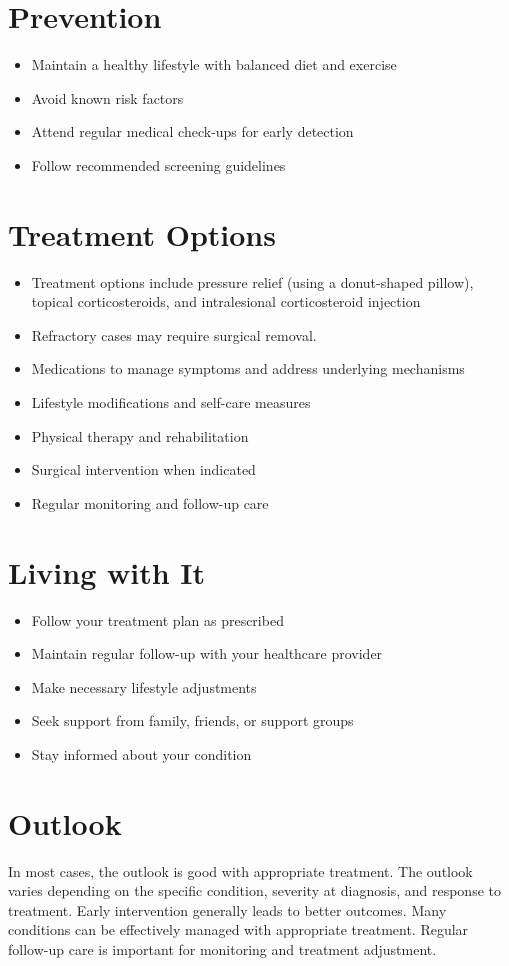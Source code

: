 \section{Prevention}
\begin{itemize}[noitemsep]
  \item Maintain a healthy lifestyle with balanced diet and exercise
  \item Avoid known risk factors
  \item Attend regular medical check-ups for early detection
  \item Follow recommended screening guidelines
\end{itemize}
\section{Treatment Options}
\begin{itemize}[noitemsep]
  \item Treatment options include pressure relief (using a donut-shaped pillow), topical corticosteroids, and intralesional corticosteroid injection
  \item Refractory cases may require surgical removal.
  \item Medications to manage symptoms and address underlying mechanisms
  \item Lifestyle modifications and self-care measures
  \item Physical therapy and rehabilitation
  \item Surgical intervention when indicated
  \item Regular monitoring and follow-up care
\end{itemize}
\section{Living with It}
\begin{itemize}[noitemsep]
  \item Follow your treatment plan as prescribed
  \item Maintain regular follow-up with your healthcare provider
  \item Make necessary lifestyle adjustments
  \item Seek support from family, friends, or support groups
  \item Stay informed about your condition
\end{itemize}
\section{Outlook}
In most cases, the outlook is good with appropriate treatment. The outlook varies depending on the specific condition, severity at diagnosis, and response to treatment. Early intervention generally leads to better outcomes. Many conditions can be effectively managed with appropriate treatment. Regular follow-up care is important for monitoring and treatment adjustment.
